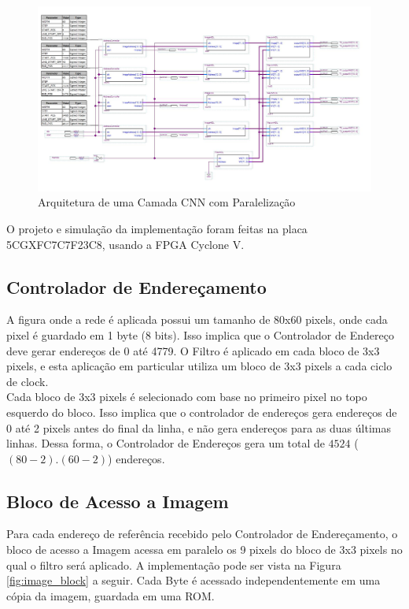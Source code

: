 \documentclass[12pt]{article}
\begin{document}
\begin{figure}[h]
	\centering
	\includegraphics[width=.8\textwidth]{CNN_Layer-P.jpg}
	\caption{Arquitetura de uma Camada CNN com Paralelização}
	\label{fig:arch_par}
\end{figure}

O projeto e simulação da implementação foram feitas na placa 5CGXFC7C7F23C8, usando a FPGA
Cyclone V.\\

\subsection{Controlador de Endereçamento}

A figura onde a rede é aplicada possui um tamanho de 80x60 pixels, onde cada pixel é guardado
em 1 byte (8 bits). Isso implica que o Controlador de Endereço deve gerar endereços de 0 até
4779. O Filtro é aplicado em cada bloco de 3x3 pixels, e esta aplicação em particular
utiliza um bloco de 3x3 pixels a cada ciclo de clock.\\
Cada bloco de 3x3 pixels é selecionado com base no primeiro pixel no topo esquerdo do bloco.
Isso implica que o controlador de endereços gera endereços de 0 até 2 pixels antes do final
da linha, e não gera endereços para as duas últimas linhas. Dessa forma, o Controlador de
Endereços gera um total de $4524$ ($(80-2).(60-2)$) endereços.\\

\subsection{Bloco de Acesso a Imagem}

Para cada endereço de referência recebido pelo Controlador de Endereçamento, o bloco de acesso
a Imagem acessa em paralelo os 9 pixels do bloco de 3x3 pixels no qual o filtro será aplicado.
A implementação pode ser vista na Figura \ref{fig:image_block} a seguir. Cada Byte é acessado independentemente em uma cópia da imagem, guardada em uma ROM.\\
\end{document}
